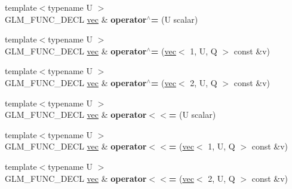 \begin{DoxyCompactItemize}
{\footnotesize template$<$typename U $>$ }\\G\+L\+M\+\_\+\+F\+U\+N\+C\+\_\+\+D\+E\+CL \hyperlink{structglm_1_1vec}{vec} \& {\bfseries operator$^\wedge$=} (U scalar)
\item 
\mbox{\label{structglm_1_1vec_3_012_00_01T_00_01Q_01_4_a78bce23dda849b6e10228af66f698597}} 
{\footnotesize template$<$typename U $>$ }\\G\+L\+M\+\_\+\+F\+U\+N\+C\+\_\+\+D\+E\+CL \hyperlink{structglm_1_1vec}{vec} \& {\bfseries operator$^\wedge$=} (\hyperlink{structglm_1_1vec}{vec}$<$ 1, U, Q $>$ const \&v)
\item 
\mbox{\label{structglm_1_1vec_3_012_00_01T_00_01Q_01_4_aee4803e0202a355622479781010b203b}} 
{\footnotesize template$<$typename U $>$ }\\G\+L\+M\+\_\+\+F\+U\+N\+C\+\_\+\+D\+E\+CL \hyperlink{structglm_1_1vec}{vec} \& {\bfseries operator$^\wedge$=} (\hyperlink{structglm_1_1vec}{vec}$<$ 2, U, Q $>$ const \&v)
\item 
\mbox{\label{structglm_1_1vec_3_012_00_01T_00_01Q_01_4_ad7b07e1346a5e808343241891129d11e}} 
{\footnotesize template$<$typename U $>$ }\\G\+L\+M\+\_\+\+F\+U\+N\+C\+\_\+\+D\+E\+CL \hyperlink{structglm_1_1vec}{vec} \& {\bfseries operator$<$$<$=} (U scalar)
\item 
\mbox{\label{structglm_1_1vec_3_012_00_01T_00_01Q_01_4_a8ab9f3c08e3bcd5376f5852b15069a43}} 
{\footnotesize template$<$typename U $>$ }\\G\+L\+M\+\_\+\+F\+U\+N\+C\+\_\+\+D\+E\+CL \hyperlink{structglm_1_1vec}{vec} \& {\bfseries operator$<$$<$=} (\hyperlink{structglm_1_1vec}{vec}$<$ 1, U, Q $>$ const \&v)
\item 
\mbox{\label{structglm_1_1vec_3_012_00_01T_00_01Q_01_4_a6ddb083ba5a5c11f378fb85c8842cc9c}} 
{\footnotesize template$<$typename U $>$ }\\G\+L\+M\+\_\+\+F\+U\+N\+C\+\_\+\+D\+E\+CL \hyperlink{structglm_1_1vec}{vec} \& {\bfseries operator$<$$<$=} (\hyperlink{structglm_1_1vec}{vec}$<$ 2, U, Q $>$ const \&v)
\item 

\end{DoxyCompactItemize}
